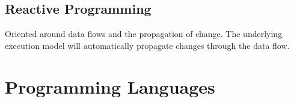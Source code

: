 \subsection{Reactive Programming}
Oriented around data flows and the propagation of change. The
underlying execution model will automatically propagate changes
through the data flow. 


\section{Programming Languages}



